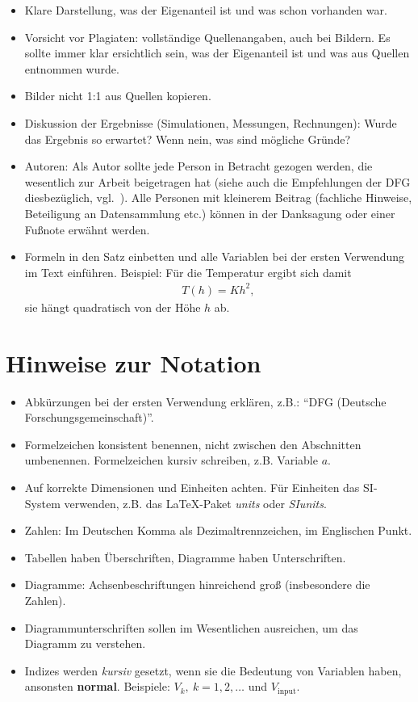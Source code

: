 \documentclass[journal,final,a4paper,twoside]{PS}
\begin{document}
\begin{itemize}
 \item Klare Darstellung, was der Eigenanteil ist und was schon vorhanden war.
 \item Vorsicht vor Plagiaten: vollständige Quellenangaben, auch bei Bildern. Es sollte immer klar ersichtlich sein, was der Eigenanteil ist und was aus Quellen entnommen wurde.
 \item Bilder nicht 1:1 aus Quellen kopieren.
 \item Diskussion der Ergebnisse (Simulationen, Messungen, Rechnungen): Wurde das Ergebnis so erwartet? Wenn nein, was sind mögliche Gründe?
 \item Autoren: Als Autor sollte jede Person in Betracht gezogen werden, die wesentlich zur Arbeit beigetragen hat (siehe auch die Empfehlungen der DFG diesbezüglich, vgl.~\cite{wissPraxis:DFG}). Alle Personen mit kleinerem Beitrag (fachliche Hinweise, Beteiligung an Datensammlung etc.) können in der Danksagung oder einer Fußnote erwähnt werden.
\item Formeln in den Satz einbetten und alle Variablen bei der ersten Verwendung im Text einführen. Beispiel:
 Für die Temperatur ergibt sich damit
 \begin{align*}
  T(h) = K h^2,
 \end{align*}
 sie hängt quadratisch von der Höhe $h$ ab.
\end{itemize}

\section{Hinweise zur Notation}
\label{sec:notation}
\begin{itemize}
 \item Abkürzungen bei der ersten Verwendung erklären, z.B.: ``DFG (Deutsche Forschungsgemeinschaft)''.
 \item Formelzeichen konsistent benennen, nicht zwischen den Abschnitten umbenennen. Formelzeichen kursiv schreiben, z.B. Variable $a$.
 \item Auf korrekte Dimensionen und Einheiten achten. Für Einheiten das SI-System verwenden, z.B. das LaTeX-Paket \emph{units} oder \emph{SIunits}.
 \item Zahlen: Im Deutschen Komma als Dezimaltrennzeichen, im Englischen Punkt.
 \item Tabellen haben Überschriften, Diagramme haben Unterschriften.
 \item Diagramme: Achsenbeschriftungen hinreichend groß (insbesondere die Zahlen).
 \item Diagrammunterschriften sollen im Wesentlichen ausreichen, um das Diagramm zu verstehen.
 \item Indizes werden \emph{kursiv} gesetzt, wenn sie die Bedeutung von Variablen haben, ansonsten \textbf{normal}. Beispiele: $V_k, \ k=1,2,\ldots$ und $V_\mathrm{input}$.
\end{itemize}
\end{document}
